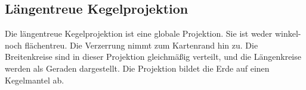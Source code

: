 \subsection{Längentreue Kegelprojektion}
\label{sec:langkeg}
Die längentreue Kegelprojektion ist eine globale Projektion. Sie ist weder winkel- noch flächentreu.
Die Verzerrung nimmt zum Kartenrand hin zu. Die Breitenkreise sind in dieser Projektion gleichmäßig verteilt, und die Längenkreise werden als Geraden dargestellt. Die Projektion bildet die Erde auf einen Kegelmantel ab.